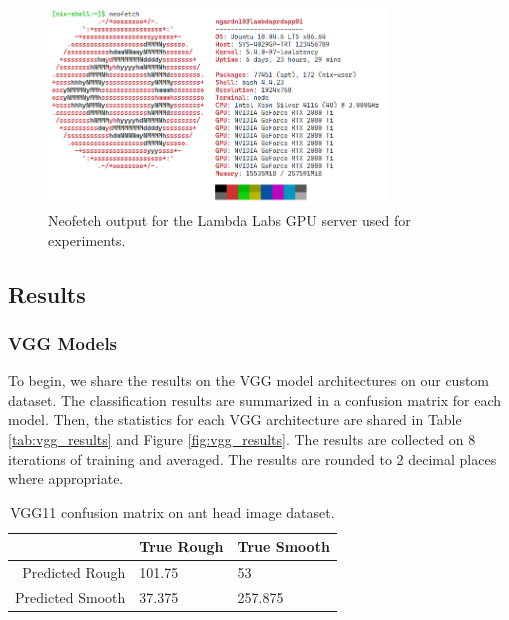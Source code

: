 \documentclass[12pt]{article}
\begin{document}
\begin{figure}[h]
    \centering
    \includegraphics[width=0.8\textwidth]{assets/images/neofetch.png}
    \caption{Neofetch output for the Lambda Labs GPU server used for
        experiments.}
    \label{fig:neofetch}
\end{figure}

\subsection{Results}
\subsubsection{VGG Models}

To begin, we share the results on the VGG model architectures on our custom
dataset. The classification results are summarized in a confusion matrix for
each model. Then, the statistics for each VGG architecture are shared in Table
\ref{tab:vgg_results} and Figure \ref{fig:vgg_results}. The results are
collected on 8 iterations of training and averaged. The results are
rounded to 2 decimal places where appropriate.

\vspace{0.5in}

\begin{table}[h]
    \centering
    \caption{VGG11 confusion matrix on ant head image dataset.}
    \begin{tabular}{r|ll}
                         & True Rough & True Smooth \\
        \hline
        Predicted Rough  & 101.75     & 53          \\
        Predicted Smooth & 37.375     & 257.875     \\
    \end{tabular}
    \label{tab:vgg11_confusion_matrix}
\end{table}
\end{document}
